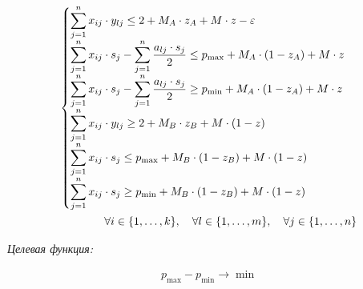 \documentclass[14pt,fleqn]{extarticle}
\begin{document}
	\begin{ceqn}
	\begin{align*}
		\begin{cases}
			\smashoperator[r]{\sum_{j=1}^{n}} x_{ij} \cdot y_{lj} \leq 2 + M_A \cdot z_A + M \cdot z - \varepsilon\\
			\smashoperator[r]{\sum_{j=1}^{n}} x_{ij} \cdot s_j - \smashoperator[r]{\sum_{j=1}^{n}} \dfrac{a_{lj} \cdot s_j}{2} \leq p_{\max} +  M_A \cdot (1 - z_A) + M \cdot z\\
			\smashoperator[r]{\sum_{j=1}^{n}} x_{ij} \cdot s_j - \smashoperator[r]{\sum_{j=1}^{n}} \dfrac{a_{lj} \cdot s_j}{2} \geq p_{\min} +  M_A \cdot (1 - z_A) + M \cdot z\\
			\smashoperator[r]{\sum_{j=1}^{n}} x_{ij} \cdot y_{lj} \geq 2 + M_B \cdot z_B + M \cdot (1-z)\\
			\smashoperator[r]{\sum_{j=1}^{n}} x_{ij} \cdot s_j \leq p_{\max} +  M_B \cdot (1 - z_B) + M \cdot (1-z)\\
			\smashoperator[r]{\sum_{j=1}^{n}} x_{ij} \cdot s_j \geq p_{\min} + M_B \cdot (1 - z_B) + M \cdot (1-z)\\
		\end{cases}\\
		\forall i \in \{1, \dots, k\}, \quad \forall l \in \{1, \dots, m\}, \quad \forall j \in \{1, \dots, n\}
	\end{align*}
	\end{ceqn}
	
	\newpage
	
	\textit{Целевая функция:}
	\begin{ceqn}
		\begin{align*}
			p_{\max} - p_{\min} \longrightarrow \min
		\end{align*}
	\end{ceqn}
\end{document}
